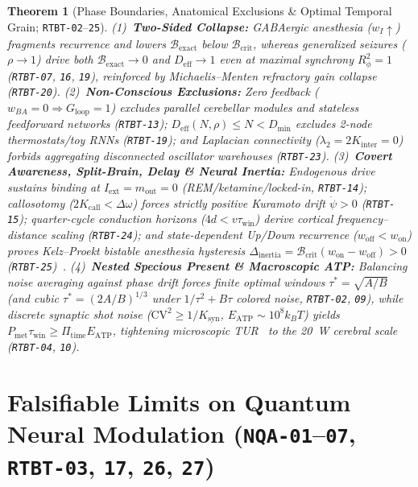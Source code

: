 \documentclass[11pt,letterpaper]{article}
\newtheorem{theorem}{Theorem}[section]
\newcommand{\code}[1]{\texttt{\small #1}}
\begin{document}
\begin{theorem}[Phase Boundaries, Anatomical Exclusions \& Optimal Temporal Grain; \code{RTBT-02}--\code{25}]
(1)~\textbf{Two-Sided Collapse:} GABAergic anesthesia ($w_I\uparrow$) fragments recurrence and lowers $\mathcal{B}_{\mathrm{exact}}$ below $\mathcal{B}_{\mathrm{crit}}$, whereas generalized seizures ($\rho \to 1$) drive both $\mathcal{B}_{\mathrm{exact}} \to 0$ and $D_{\mathrm{eff}} \to 1$ even at maximal synchrony $R_\phi^2 = 1$ (\code{RTBT-07}, \code{16}, \code{19}), reinforced by Michaelis--Menten refractory gain collapse (\code{RTBT-20}).
(2)~\textbf{Non-Conscious Exclusions:} Zero feedback ($w_{BA}=0 \Rightarrow G_{\mathrm{loop}}=1$) excludes parallel cerebellar modules and stateless feedforward networks (\code{RTBT-13}); $D_{\mathrm{eff}}(N,\rho) \le N < D_{\min}$ excludes 2-node thermostats/toy RNNs (\code{RTBT-19}); and Laplacian connectivity ($\lambda_2 = 2K_{\mathrm{inter}} = 0$) forbids aggregating disconnected oscillator warehouses (\code{RTBT-23}).
(3)~\textbf{Covert Awareness, Split-Brain, Delay \& Neural Inertia:} Endogenous drive sustains binding at $I_{\mathrm{ext}}=m_{\mathrm{out}}=0$ (REM/ketamine/locked-in, \code{RTBT-14}); callosotomy ($2K_{\mathrm{call}}<\Delta\omega$) forces strictly positive Kuramoto drift $\dot{\psi}>0$ (\code{RTBT-15}); quarter-cycle conduction horizons ($4d < v\tau_{\mathrm{win}}$) derive cortical frequency--distance scaling (\code{RTBT-24}); and state-dependent Up/Down recurrence ($w_{\mathrm{off}} < w_{\mathrm{on}}$) proves Kelz--Proekt bistable anesthesia hysteresis $\Delta_{\mathrm{inertia}} = \mathcal{B}_{\mathrm{crit}}(w_{\mathrm{on}}-w_{\mathrm{off}}) > 0$ (\code{RTBT-25})~\cite{Friedman2010}.
(4)~\textbf{Nested Specious Present \& Macroscopic ATP:} Balancing noise averaging against phase drift forces finite optimal windows $\tau^*=\sqrt{A/B}$ (and cubic $\tau^*=(2A/B)^{1/3}$ under $1/\tau^2 + B\tau$ colored noise, \code{RTBT-02}, \code{09}), while discrete synaptic shot noise ($\mathrm{CV}^2 \ge 1/K_{\mathrm{syn}}$, $E_{\mathrm{ATP}}\sim 10^8 k_B T$) yields $P_{\mathrm{met}}\tau_{\mathrm{win}} \ge \Pi_{\mathrm{time}}E_{\mathrm{ATP}}$, tightening microscopic TUR~\cite{Barato2015} to the 20~W cerebral scale (\code{RTBT-04}, \code{10}).
\end{theorem}

\section{Falsifiable Limits on Quantum Neural Modulation (\code{NQA-01}--\code{07}, \code{RTBT-03}, \code{17}, \code{26}, \code{27})}
\end{document}
